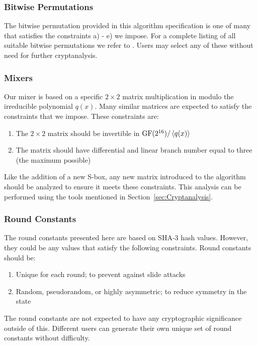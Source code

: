 \subsubsection{Bitwise Permutations}
The bitwise permutation provided in this algorithm specification is one of many that satisfies the constraints a) - e) we impose.
For a complete listing of all suitable bitwise permutations we refer to \cite{Kelly2014_Thesis}.
Users may select any of these without need for further cryptanalysis.

\subsubsection{Mixers}
Our mixer is based on a specific $2 \times 2$ matrix multiplication in \gfsixteen modulo the irreducible polynomial $q(x)$.
Many similar matrices are expected to satisfy the constraints that we impose.
These constraints are:
\begin{enumerate}
\item The $2 \times 2$ matrix should be invertible in $\mathrm{GF}(2^{16}) /\left\langle q(x) \right\rangle$
\item The matrix should have differential and linear branch number equal to three (the maximum possible)
\end{enumerate}
Like the addition of a new S-box, any new matrix introduced to the algorithm should be analyzed to ensure it meets these constraints.
This analysis can be performed using the tools mentioned in Section~\ref{sec:Cryptanalysis}.

\subsubsection{Round Constants}
The round constants presented here are based on SHA-3 hash values.
However, they could be any values that satisfy the following constraints.
Round constants should be:
\begin{enumerate}
\item Unique for each round; to prevent against slide attacks
\item Random, pseudorandom, or highly asymmetric; to reduce symmetry in the state
\end{enumerate}
The round constants are not expected to have any cryptographic significance outside of this.
Different users can generate their own unique set of round constants without difficulty.

